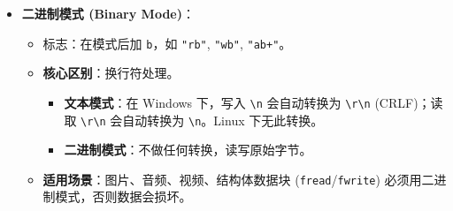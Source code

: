 \documentclass[a4paper,12pt]{article}
\begin{document}
\begin{itemize}
    \item \textbf{二进制模式 (Binary Mode)}：
    \begin{itemize}
        \item 标志：在模式后加 \texttt{b}，如 \texttt{"rb"}, \texttt{"wb"}, \texttt{"ab+"}。
        \item \textbf{核心区别}：换行符处理。
        \begin{itemize}
            \item \textbf{文本模式}：在 Windows 下，写入 \texttt{\textbackslash n} 会自动转换为 \texttt{\textbackslash r\textbackslash n} (CRLF)；读取 \texttt{\textbackslash r\textbackslash n} 会自动转换为 \texttt{\textbackslash n}。Linux 下无此转换。
            \item \textbf{二进制模式}：不做任何转换，读写原始字节。
        \end{itemize}
        \item \textbf{适用场景}：图片、音频、视频、结构体数据块 (\texttt{fread}/\texttt{fwrite}) 必须用二进制模式，否则数据会损坏。
    \end{itemize}
\end{itemize}
\end{document}
